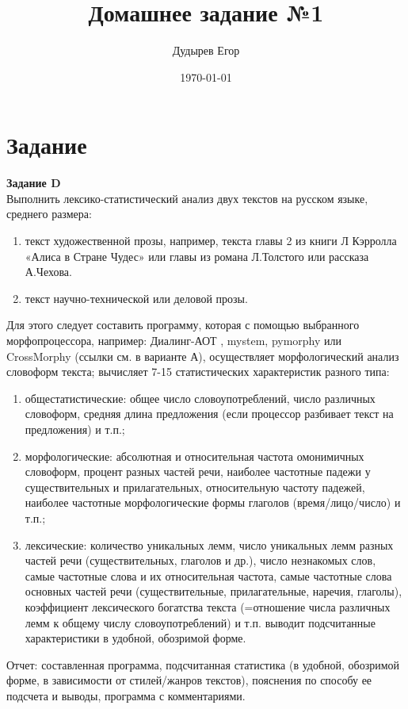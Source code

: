 \documentclass[a4paper,12pt]{article}
\begin{document}
\title{Домашнее задание №1}
\author{Дудырев Егор}
\date{\today}
\maketitle

\section{Задание}
\textbf{Задание D}\\
Выполнить лексико-статистический анализ двух текстов на русском языке, среднего размера:
\begin{enumerate}
\item текст художественной прозы, например, текста главы 2 из книги Л Кэрролла «Алиса в Стране Чудес» или главы из романа Л.Толстого или рассказа А.Чехова.
\item текст научно-технической или деловой прозы.
\end{enumerate}

Для этого следует составить программу, которая с помощью выбранного морфопроцессора, например: Диалинг-АОТ , mystem, pymorphy или CrossMorphy (ссылки см. в варианте А), осуществляет морфологический анализ словоформ текста; вычисляет 7-15 статистических характеристик разного типа:
\begin{enumerate}
\item общестатистические: общее число словоупотреблений, число различных словоформ, средняя длина предложения (если процессор разбивает текст на предложения) и т.п.;
\item морфологические: абсолютная и относительная частота омонимичных словоформ, процент разных частей речи, наиболее частотные падежи у существительных и прилагательных, относительную частоту падежей, наиболее частотные морфологические формы глаголов (время/лицо/число) и т.п.;
\item лексические: количество уникальных лемм, число уникальных лемм разных частей речи (существительных, глаголов и др.), число незнакомых слов, самые частотные слова и их относительная частота, самые частотные слова основных частей речи (существительные, прилагательные, наречия, глаголы), коэффициент лексического богатства текста (=отношение числа различных лемм к общему числу словоупотреблений) и т.п. выводит подсчитанные характеристики в удобной, обозримой форме.
\end{enumerate}

Отчет: составленная программа, подсчитанная статистика (в удобной, обозримой форме, в зависимости от стилей/жанров текстов), пояснения по способу ее подсчета и выводы, программа с комментариями.
\end{document}
